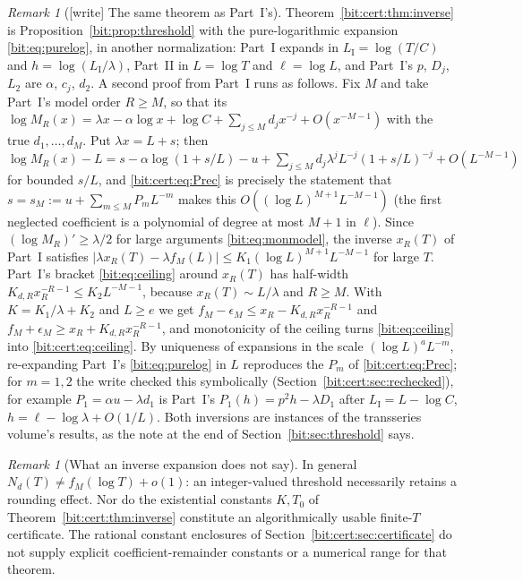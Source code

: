 \documentclass[11pt]{article}
\theoremstyle{definition}\newtheorem{definition}[theorem]{Definition}
\theoremstyle{remark}\newtheorem{remark}[theorem]{Remark}
\begin{document}
\begin{remark}[\textsf{[write]} The same theorem as Part~I's]\label{bit:cert:rem:inverse-route}
Theorem~\ref{bit:cert:thm:inverse} is Proposition~\ref{bit:prop:threshold}
with the pure-logarithmic expansion \eqref{bit:eq:purelog}, in another
normalization: Part~I expands in $L_{\mathrm I}=\log(T/C)$ and
$h=\log(L_{\mathrm I}/\lambda)$, Part~II in $L=\log T$ and $\ell=\log L$, and
Part~I's $p$, $D_j$, $L_2$ are $\alpha$, $c_j$, $d_2$. A second proof from
Part~I runs as follows. Fix $M$ and take Part~I's model order $R\ge M$, so
that its $\log M_R(x)=\lambda x-\alpha\log x+\log C+\sum_{j\le M}d_jx^{-j}+O(x^{-M-1})$
with the true $d_1,\ldots,d_M$. Put $\lambda x=L+s$; then
$\log M_R(x)-L=s-\alpha\log(1+s/L)-u+\sum_{j\le M}d_j\lambda^jL^{-j}(1+s/L)^{-j}+O(L^{-M-1})$
for bounded $s/L$, and \eqref{bit:cert:eq:Prec} is precisely the statement
that $s=s_M:=u+\sum_{m\le M}P_mL^{-m}$ makes this $O((\log L)^{M+1}L^{-M-1})$
(the first neglected coefficient is a polynomial of degree at most $M+1$ in
$\ell$). Since $(\log M_R)'\ge\lambda/2$ for large arguments
\eqref{bit:eq:monmodel}, the inverse $x_R(T)$ of Part~I satisfies
$|\lambda x_R(T)-\lambda f_M(L)|\le K_1(\log L)^{M+1}L^{-M-1}$ for large $T$.
Part~I's bracket \eqref{bit:eq:ceiling} around $x_R(T)$ has half-width
$K_{d,R}x_R^{-R-1}\le K_2L^{-M-1}$, because $x_R(T)\sim L/\lambda$ and
$R\ge M$. With $K=K_1/\lambda+K_2$ and $L\ge e$ we get
$f_M-\epsilon_M\le x_R-K_{d,R}x_R^{-R-1}$ and
$f_M+\epsilon_M\ge x_R+K_{d,R}x_R^{-R-1}$, and monotonicity of the ceiling
turns \eqref{bit:eq:ceiling} into \eqref{bit:cert:eq:ceiling}. By uniqueness of expansions in the scale $(\log L)^aL^{-m}$, re-expanding
Part~I's \eqref{bit:eq:purelog} in $L$ reproduces the $P_m$ of
\eqref{bit:cert:eq:Prec}; for $m=1,2$ the write checked this symbolically
(Section~\ref{bit:cert:sec:rechecked}), for example $P_1=\alpha u-\lambda d_1$
is Part~I's $P_1(h)=p^2h-\lambda D_1$ after $L_{\mathrm I}=L-\log C$,
$h=\ell-\log\lambda+O(1/L)$. Both inversions are instances of the transseries
volume's results, as the note at the end of Section~\ref{bit:sec:threshold}
says.
\end{remark}

\begin{remark}[What an inverse expansion does not say]\label{bit:cert:rem:notsay}
In general $N_d(T)\ne f_M(\log T)+o(1)$: an integer-valued threshold
necessarily retains a rounding effect. Nor do the existential constants
$K,T_0$ of Theorem~\ref{bit:cert:thm:inverse} constitute an algorithmically
usable finite-$T$ certificate. The rational constant enclosures of
Section~\ref{bit:cert:sec:certificate} do not supply explicit
coefficient-remainder constants or a numerical range for that theorem.
\end{remark}
\end{document}
